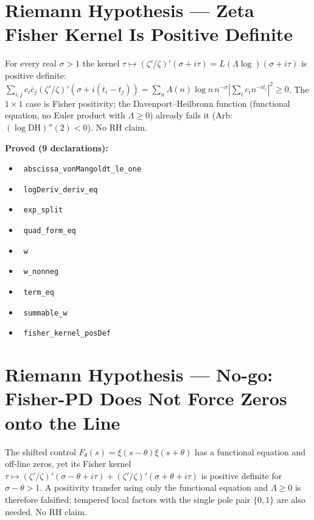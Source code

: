 \documentclass{report}
\theoremstyle{definition}
\begin{document}
\section{Riemann Hypothesis --- Zeta Fisher Kernel Is Positive Definite}
For every real $\sigma>1$ the kernel $\tau\mapsto(\zeta'/\zeta)'(\sigma+i\tau)=L(\Lambda\log)(\sigma+i\tau)$ is positive definite: $\sum_{i,j}c_i\bar c_j(\zeta'/\zeta)'(\sigma+i(t_i-t_j))=\sum_n\Lambda(n)\log n\,n^{-\sigma}|\sum_i c_i n^{-it_i}|^2\ge0$. The $1\times1$ case is Fisher positivity; the Davenport--Heilbronn function (functional equation, no Euler product with $\Lambda\ge0$) already fails it (Arb: $(\log\mathrm{DH})''(2)<0$). No RH claim.

\noindent\textbf{Proved (9 declarations):}
\begin{itemize}
  \item {}\leanok\ \texttt{abscissa\_vonMangoldt\_le\_one}
  \item {}\leanok\ \texttt{logDeriv\_deriv\_eq}
  \item {}\leanok\ \texttt{exp\_split}
  \item {}\leanok\ \texttt{quad\_form\_eq}
  \item {}\leanok\ \texttt{w}
  \item {}\leanok\ \texttt{w\_nonneg}
  \item {}\leanok\ \texttt{term\_eq}
  \item {}\leanok\ \texttt{summable\_w}
  \item {}\leanok\ \texttt{fisher\_kernel\_posDef}
\end{itemize}

\section{Riemann Hypothesis --- No-go: Fisher-PD Does Not Force Zeros onto the Line}
The shifted control $F_\theta(s)=\xi(s-\theta)\xi(s+\theta)$ has a functional equation and off-line zeros, yet its Fisher kernel $\tau\mapsto(\zeta'/\zeta)'(\sigma-\theta+i\tau)+(\zeta'/\zeta)'(\sigma+\theta+i\tau)$ is positive definite for $\sigma-\theta>1$. A positivity transfer using only the functional equation and $\Lambda\ge0$ is therefore falsified; tempered local factors with the single pole pair $\{0,1\}$ are also needed. No RH claim.
\end{document}
